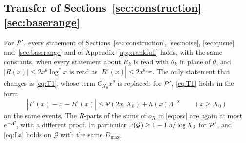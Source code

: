 \subsection{Transfer of Sections~\ref{sec:construction}--\ref{sec:baserange}}
\begin{lemma}[Transfer]\label{lem:onezero-transfer}
For $\mathcal{P}'$, every statement of Sections~\ref{sec:construction}, \ref{sec:noise}, \ref{sec:queue} and~\ref{sec:baserange} and of
Appendix~\ref{app:rankfull} holds, with the same constants, when every statement about $R_k$ is read with $\theta_k$ in place of
$\theta$, and $|R(x)|\le2x^{\theta}\log^*x$ is read as $|R^\flat(x)|\le2x^{\theta_{\max}}$. The only statement that changes is \eqref{eq:T1},
whose term $C_{X_0}x^\theta$ is replaced: for $\mathcal{P}'$, \eqref{eq:T1} holds in the form
\begin{equation}\label{eq:T1flat}
  |T^\flat(x)-x-R^\flat(x)|\le\Psi(2x,X_0)+h(x)\Lambda^{-8}\qquad(x\ge X_0)
\end{equation}
on the same events. The $R$-parts of the sums of $o_R$ in \eqref{eq:osc} are again at most $e^{-\Lambda^2}$, with a different proof. In
particular
$\mathbb{P}(\mathcal G)\ge1-1.5/\log X_0$ for $\mathcal{P}'$, and \eqref{eq:La} holds on $\mathcal G$ with the same $D_{\max}$.
\end{lemma}

